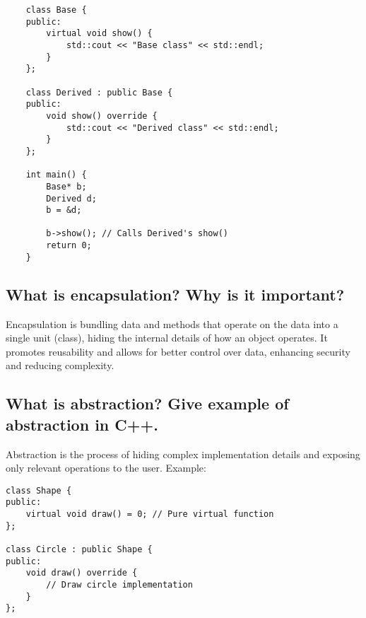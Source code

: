 \begin{itemize}
\begin{itemize}
\begin{tcolorbox}[title=Runtime Polymorphism using Virtual Functions]
\begin{verbatim}
    class Base {
    public:
        virtual void show() {
            std::cout << "Base class" << std::endl;
        }
    };

    class Derived : public Base {
    public:
        void show() override {
            std::cout << "Derived class" << std::endl;
        }
    };

    int main() {
        Base* b;
        Derived d;
        b = &d;

        b->show(); // Calls Derived's show()
        return 0;
    }
    \end{verbatim}
    \end{tcolorbox}
\end{itemize}
\end{itemize}


\subsection{What is encapsulation? Why is it important?}
Encapsulation is bundling data and methods that operate on the data into a single unit (class), hiding the internal details of how an object operates. It promotes reusability and allows for better control over data, enhancing security and reducing complexity.

\subsection{What is abstraction? Give example of abstraction in C++.}
Abstraction is the process of hiding complex implementation details and exposing only relevant operations to the user. Example:
\begin{tcolorbox}[title=Abstraction]
\begin{verbatim}
class Shape {
public:
    virtual void draw() = 0; // Pure virtual function
};

class Circle : public Shape {
public:
    void draw() override {
        // Draw circle implementation
    }
};
\end{verbatim}
\end{tcolorbox}

